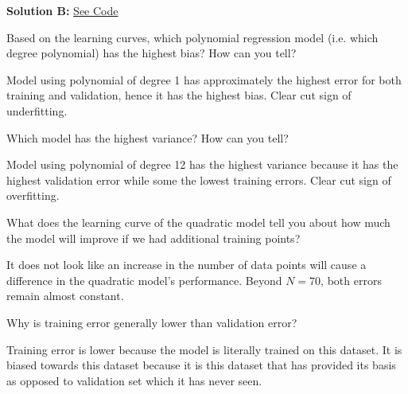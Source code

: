\documentclass{article}
\begin{document}
\textbf{Solution B: }\href{https://drive.google.com/file/d/1pUv5Fm7kRCI10N6tZnDBcdPk7N4YLMxT/view?usp=sharing}{See Code}
    \begin{figure}[ht]
    \centering
    \label{fig:foobar}
\end{figure}
\newpage
\begin{problem}[3]
  Based on the learning curves, which polynomial regression model (i.e. which degree polynomial) has the highest bias? How can you tell?
\end{problem}
\begin{solution}
Model using polynomial of degree 1 has approximately the highest error for both training and validation, hence it has the highest bias. Clear cut sign of underfitting.
\end{solution}

\begin{problem}[3]
  Which model has the highest variance? How can you tell?
\end{problem}
\begin{solution}
Model using polynomial of degree 12 has the highest variance because it has the highest validation error while some the lowest training errors. Clear cut sign of overfitting.
\end{solution}

\begin{problem}[3]
  What does the learning curve of the quadratic model tell you about how much the model will improve if we had additional training points?
\end{problem}
\begin{solution}
It does not look like an increase in the number of data points will cause a difference in the quadratic model's performance. Beyond $N = 70$, both errors remain almost constant.
\end{solution}

\begin{problem}[3]
  Why is training error generally lower than validation error?
\end{problem}
\begin{solution}
  Training error is lower because the model is literally trained on this dataset. It is biased towards this dataset because it is this dataset that has provided its basis as opposed to validation set which it has never seen.
\end{solution}
\end{document}
